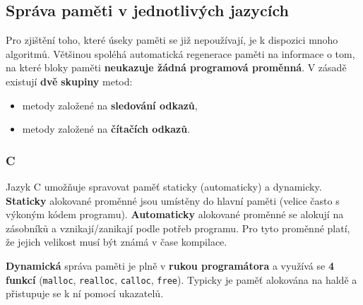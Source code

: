 \subsection{Správa paměti v jednotlivých jazycích}
Pro zjištění toho, které úseky paměti se již nepoužívají, je k dispozici mnoho algoritmů. Většinou spoléhá automatická regenerace paměti na informace o tom, na které bloky paměti \textbf{neukazuje žádná programová proměnná}. V zásadě existují \textbf{dvě} \textbf{skupiny} metod:
\begin{itemize}
	\item metody založené na \textbf{sledování odkazů},
	\item metody založené na \textbf{čítačích odkazů}.
\end{itemize}

\subsubsection{C}
Jazyk C umožňuje spravovat paměť staticky (automaticky) a dynamicky. \textbf{Staticky} alokované proměnné jsou umístěny do hlavní paměti (velice často s výkoným kódem programu). \textbf{Automaticky} alokované proměnné se alokují na zásobníků a vznikají/zanikají podle potřeb programu. Pro tyto proměnné platí, že jejich velikost musí být známá v čase kompilace.

\textbf{Dynamická} správa paměti je plně v \textbf{rukou programátora} a využívá se \textbf{4 funkcí} (\texttt{malloc}, \texttt{realloc}, \texttt{calloc}, \texttt{free}). Typicky je paměť alokována na haldě a přistupuje se k ní pomocí ukazatelů. 

